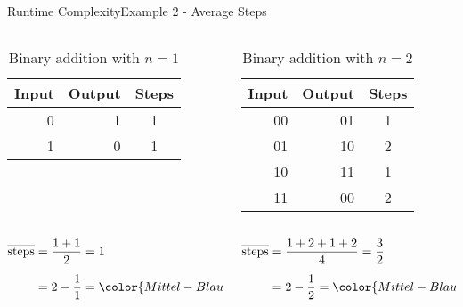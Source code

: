 \begin{frame}{Runtime Complexity}{Example 2 - Average Steps}
  \vspace{-3em}
  \begin{columns}
    \begin{column}[t]{0.5\linewidth}
      \begin{table}[!t]%
        \caption{Binary addition with $n=1$}%
        \label{tab:runtime:binary_addition_one}%
        \begin{tabular}{rrc}%
          Input & Output & Steps\\
          \midrule
          0 & 1 & 1\\
          1 & 0 & 1
        \end{tabular}
      \end{table}
    \end{column}
    \begin{column}[t]{0.5\linewidth}
      \begin{table}[!t]%
        \caption{Binary addition with $n=2$}%
        \label{tab:runtime:binary_addition_two}%
        \begin{tabular}{rrc}%
          Input & Output & Steps\\
          \midrule
          00 & 01 & 1\\
          01 & 10 & 2\\
          10 & 11 & 1\\
          11 & 00 & 2
        \end{tabular}
      \end{table}
    \end{column}
  \end{columns}
  \begin{columns}
    \begin{column}{0.5\linewidth}
      \begin{align*}
        \overline{\text{steps}} &= \frac{1+1}{2} = 1\\[0.5em]
        {} &= 2 - \frac{1}{1} = {\color{Mittel-Blau}2 - \frac{1}{2^{n-1}}}
      \end{align*}
    \end{column}
    \begin{column}{0.5\linewidth}
      \begin{align*}
        \overline{\text{steps}} &= \frac{1+2+1+2}{4} = \frac{3}{2}\\[0.5em]
        {} &= 2 - \frac{1}{2} = {\color{Mittel-Blau}2 - \frac{1}{2^{n-1}}}
      \end{align*}
    \end{column}
  \end{columns}
\end{frame}

